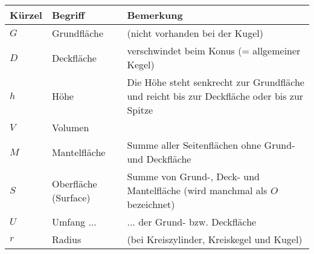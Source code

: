 \begin{tabular}{|l|p{6cm}|p{9cm}|}
  \hline
  Kürzel & Begriff& Bemerkung\\\hline
  $G$  & Grundfläche & (nicht vorhanden bei der Kugel)\\\hline
  $D$  & Deckfläche & verschwindet beim Konus (= allgemeiner Kegel)\\\hline
  $h$  & Höhe & Die Höhe steht senkrecht zur Grundfläche und reicht bis zur Deckfläche oder bis zur Spitze\\\hline
  $V$  & Volumen & \\\hline
  $M$  & Mantelfläche & Summe aller Seitenflächen ohne Grund- und Deckfläche\\\hline
  $S$  & Oberfläche (Surface)& Summe von Grund-, Deck- und Mantelfläche
  (wird manchmal als $O$ bezeichnet)\\\hline
  $U$  & Umfang ... & ... der Grund- bzw. Deckfläche \\\hline
  $r$  & Radius & (bei Kreiszylinder, Kreiskegel und Kugel)\\\hline
  \end{tabular} 
\newpage
